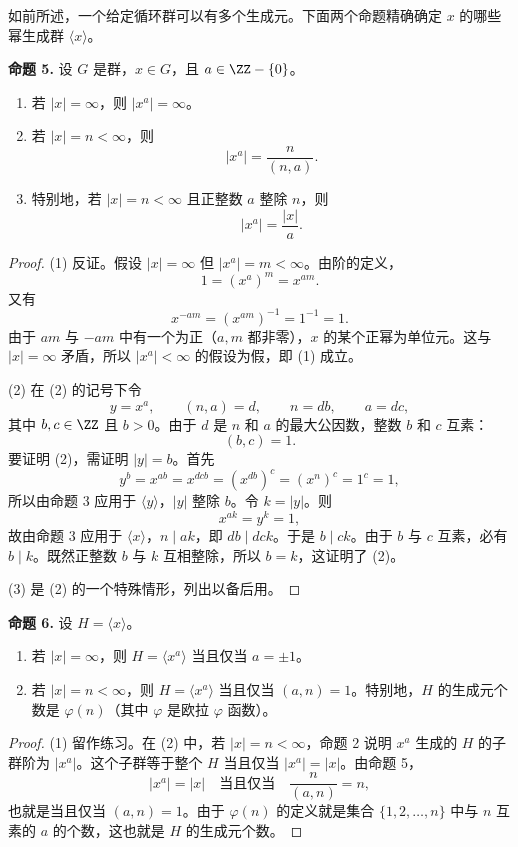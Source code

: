 如前所述，一个给定循环群可以有多个生成元。下面两个命题精确确定 $x$ 的哪些幂生成群 $\langle x\rangle$。

\medskip
\noindent\textbf{命题 5.} 设 $G$ 是群，$x\in G$，且 $a\in\ZZ-\{0\}$。
\begin{enumerate}[label=(\arabic*)]
  \item 若 $|x|=\infty$，则 $|x^a|=\infty$。
  \item 若 $|x|=n<\infty$，则
  \[
    |x^a|=\frac{n}{(n,a)}.
  \]
  \item 特别地，若 $|x|=n<\infty$ 且正整数 $a$ 整除 $n$，则
  \[
    |x^a|=\frac{|x|}{a}.
  \]
\end{enumerate}

\begin{proof}
(1) 反证。假设 $|x|=\infty$ 但 $|x^a|=m<\infty$。由阶的定义，
\[
  1=(x^a)^m=x^{am}.
\]
又有
\[
  x^{-am}=(x^{am})^{-1}=1^{-1}=1.
\]
由于 $am$ 与 $-am$ 中有一个为正（$a,m$ 都非零），$x$ 的某个正幂为单位元。这与 $|x|=\infty$ 矛盾，所以 $|x^a|<\infty$ 的假设为假，即 (1) 成立。

(2) 在 (2) 的记号下令
\[
  y=x^a,
  \qquad (n,a)=d,
  \qquad n=db,
  \qquad a=dc,
\]
其中 $b,c\in\ZZ$ 且 $b>0$。由于 $d$ 是 $n$ 和 $a$ 的最大公因数，整数 $b$ 和 $c$ 互素：
\[
  (b,c)=1.
\]
要证明 (2)，需证明 $|y|=b$。首先
\[
  y^b=x^{ab}=x^{dcb}=(x^{db})^c=(x^n)^c=1^c=1,
\]
所以由命题 3 应用于 $\langle y\rangle$，$|y|$ 整除 $b$。令 $k=|y|$。则
\[
  x^{ak}=y^k=1,
\]
故由命题 3 应用于 $\langle x\rangle$，$n\mid ak$，即 $db\mid dck$。于是 $b\mid ck$。由于 $b$ 与 $c$ 互素，必有 $b\mid k$。既然正整数 $b$ 与 $k$ 互相整除，所以 $b=k$，这证明了 (2)。

(3) 是 (2) 的一个特殊情形，列出以备后用。
\end{proof}

\medskip
\noindent\textbf{命题 6.} 设 $H=\langle x\rangle$。
\begin{enumerate}[label=(\arabic*)]
  \item 若 $|x|=\infty$，则 $H=\langle x^a\rangle$ 当且仅当 $a=\pm1$。
  \item 若 $|x|=n<\infty$，则 $H=\langle x^a\rangle$ 当且仅当 $(a,n)=1$。特别地，$H$ 的生成元个数是 $\varphi(n)$（其中 $\varphi$ 是欧拉 $\varphi$ 函数）。
\end{enumerate}

\begin{proof}
(1) 留作练习。在 (2) 中，若 $|x|=n<\infty$，命题 2 说明 $x^a$ 生成的 $H$ 的子群阶为 $|x^a|$。这个子群等于整个 $H$ 当且仅当 $|x^a|=|x|$。由命题 5，
\[
  |x^a|=|x| \quad\text{当且仅当}\quad \frac{n}{(a,n)}=n,
\]
也就是当且仅当 $(a,n)=1$。由于 $\varphi(n)$ 的定义就是集合 $\{1,2,\ldots,n\}$ 中与 $n$ 互素的 $a$ 的个数，这也就是 $H$ 的生成元个数。
\end{proof}

